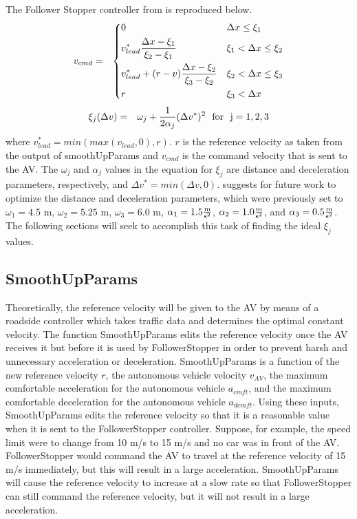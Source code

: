 \documentclass[conference]{IEEEtran}
\begin{document}
The Follower Stopper controller from \cite{Real-time} is reproduced below. 
\begin{eqnarray}
v_{cmd} &=& \begin{dcases}
        0 								& \Delta x\leq \xi_1 \\
        v_{lead}^*{\Delta x-\xi_1\over\xi_2-\xi_1} 			& \xi_1< \Delta x\leq \xi_2 \\
        v_{lead}^*+(r-v){\Delta x-\xi_2\over\xi_3-\xi_2}			& \xi_2< \Delta x\leq \xi_3 \\
        r 								& \xi_3< \Delta x \\
    \end{dcases}
\end{eqnarray}
\begin{eqnarray}
\xi_j(\Delta v)	&=& \omega_j + {1\over 2\alpha_j}(\Delta v^*)^2 \ \ {\rm for \ \ j=1, 2, 3}
\end{eqnarray}
where $v^*_{lead} = min(max(v_{lead}, 0), r)$. $r$ is the reference velocity as taken from the output of smoothUpParams and $v_{cmd}$ is the command velocity that is sent to the AV. The $\omega_j$ and $\alpha_j$ values in the equation for $\xi_j$ are distance and deceleration parameters, respectively, and $\Delta v^*=min(\Delta v, 0)$. \cite{Real-time} suggests for future work to optimize the distance and deceleration parameters, which were previously set to $\omega_1=4.5$ m, $\omega_2=5.25$ m, $\omega_3=6.0$ m, $\alpha_1=1.5 {\rm {m\over s^2}}$, $\alpha_2=1.0 {\rm {m\over s^2}}$, and $\alpha_3=0.5 {\rm {m\over s^2}}$. The following sections will seek to accomplish this task of finding the ideal $\xi_j$ values.

\subsection{SmoothUpParams}
Theoretically, the reference velocity will be given to the AV by means of a roadside controller which takes traffic data and determines the optimal constant velocity. The function SmoothUpParams edits the reference velocity once the AV receives it but before it is used by FollowerStopper in order to prevent harsh and unnecessary acceleration or deceleration. SmoothUpParams is a function of the new reference velocity $r$, the autonomous vehicle velocity $v_{AV}$, the maximum comfortable acceleration for the autonomous vehicle $a_{cmft}$, and the maximum comfortable deceleration for the autonomous vehicle $a_{dcmft}$. Using these inputs, SmoothUpParams edits the reference velocity so that it is a reasonable value when it is sent to the FollowerStopper controller. Suppose, for example, the speed limit were to change from 10 m/s to 15 m/s and no car was in front of the AV. FollowerStopper would command the AV to travel at the reference velocity of 15 m/s immediately, but this will result in a large acceleration. SmoothUpParams will cause the reference velocity to increase at a slow rate so that FollowerStopper can still command the reference velocity, but it will not result in a large acceleration.
\end{document}
